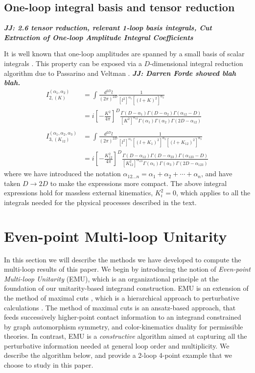 \documentclass[12pt,letter]{article}
\def\be{\begin{equation}}
\def\ee{\end{equation}}
\def\dj#1{{\color{NUpurple}\it \bf JJ: #1}}
\begin{document}
\subsection{One-loop integral basis and tensor reduction}\label{sec:1loopMethods}
\dj{2.6 tensor reduction, relevant 1-loop basis integrals, Cut Extraction of One-loop Amplitude Integral Coefficients}

It is well known that one-loop amplitudes are spanned by a small basis of scalar integrals \cite{Forde:2007mi,Badger:2008cm,ElvangHuangReview}. This property can be exposed via a $D$-dimensional integral reduction algorithm due to Passarino and Veltman \cite{Passarino:1978jh}.  \dj{Darren Forde showed blah blah.}
\be\label{eq:integrals}
\boxed{
\begin{aligned}
I_{2,(K)}^{(\alpha_1,\alpha_2)}&=\int \frac{d^{2D} l}{(2\pi)^{2D}} \frac{1}{[l^2]^{\alpha_1}[(l+K)^2]^{\alpha_2}} 
\\
&=i\left[-\frac{K^2}{4\pi}\right]^D\frac{\Gamma(D-\alpha_1)\Gamma(D-\alpha_2)\Gamma(\alpha_{12}-D)}{[K^2]^{\alpha_{12}}\Gamma(\alpha_1)\Gamma(\alpha_2)\Gamma(2D-\alpha_{12})} 
 \\\\
I_{3,(K_{12})}^{(\alpha_1,\alpha_2,\alpha_3)}&= \int \frac{d^{2D} l}{(2\pi)^{2D}} \frac{1}{[l^2]^{\alpha_1}[(l+K_1)^2]^{\alpha_2}[(l+K_{12})^2]^{\alpha_3}} 
\\
&=i\left[-\frac{K_{12}^2}{4\pi}\right]^D\frac{\Gamma(D-\alpha_{12})\Gamma(D-\alpha_{23})\Gamma(\alpha_{123}-D)}{[K_{12}^2]^{\alpha_{123}}\Gamma(\alpha_1)\Gamma(\alpha_3)\Gamma(2D-\alpha_{123})} 
\end{aligned}
}
\ee
where we have introduced the notation $\alpha_{12...n} = \alpha_1+\alpha_2+\cdots +\alpha_n$, and have taken $D\rightarrow 2D$ to make the expressions more compact. The above integral expressions hold for massless external kinematics, $K_i^2=0$, which applies to all the integrals needed for the physical processes described in the text. 
\section{Even-point Multi-loop Unitarity}
\label{sec:EMU}
In this section we will describe the methods we have developed to compute the multi-loop results of this paper. We begin by introducing the notion of \textit{Even-point Multi-loop Unitarity} (EMU), which is an organizational principle at the foundation of our unitarity-based integrand construction. EMU is an extension of the method of maximal cuts \cite{}, which is a hierarchical approach to perturbative calculations \cite{}. The method of maximal cuts is an ansatz-based approach, that feeds successively higher-point contact information to an integrand constrained by graph automorphism symmetry, and color-kinematics duality for permissible theories. In contrast, EMU is a \textit{constructive} algorithm aimed at capturing all the perturbative information needed at general loop order and multiplicity. We describe the algorithm below, and provide a 2-loop 4-point example that we choose to study in this paper.
\end{document}
